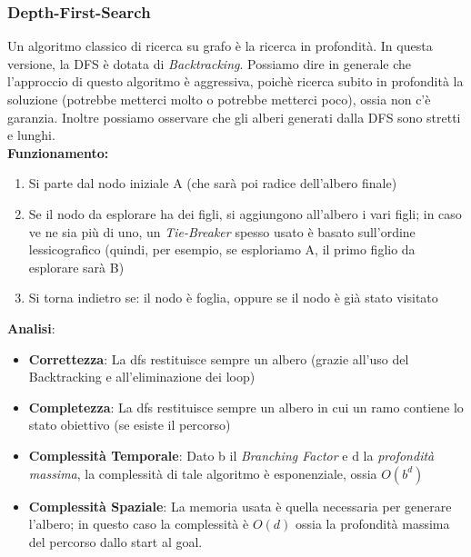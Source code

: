 \subsubsection{Depth-First-Search}
Un algoritmo classico di ricerca su grafo è la ricerca in profondità. In questa versione, la DFS è dotata di \textit{Backtracking}. Possiamo 
dire in generale che l'approccio di questo algoritmo è aggressiva, poichè ricerca subito in profondità la soluzione (potrebbe metterci molto o potrebbe metterci poco), ossia non c'è garanzia.
Inoltre possiamo osservare che gli alberi generati dalla DFS sono stretti e lunghi.\\
\smallskip
\textbf{Funzionamento:}
\begin{enumerate}
    \item Si parte dal nodo iniziale A (che sarà poi radice dell'albero finale)
    \item Se il nodo da esplorare ha dei figli, si aggiungono all'albero i vari figli; in caso ve ne sia più di uno,
    un \textit{Tie-Breaker} spesso usato è basato sull'ordine lessicografico (quindi, per esempio, se esploriamo A, il primo figlio da esplorare sarà B)
    \item Si torna indietro se: il nodo è foglia, oppure se il nodo è già stato visitato
\end{enumerate}

\textbf{Analisi}:
\begin{itemize}
    \item \textbf{Correttezza}: La dfs restituisce sempre un albero (grazie all'uso del Backtracking e all'eliminazione dei loop)
    \item \textbf{Completezza}: La dfs restituisce sempre un albero in cui un ramo contiene lo stato obiettivo (se esiste il percorso)
    \item \textbf{Complessità Temporale}: Dato b il \textit{Branching Factor} e d la \textit{profondità massima}, la complessità di tale algoritmo è esponenziale, ossia $O(b^d)$
    \item \textbf{Complessità Spaziale}: La memoria usata è quella necessaria per generare l'albero; in questo caso la complessità è $O(d)$ ossia la profondità massima del percorso dallo start al goal.

\end{itemize}

